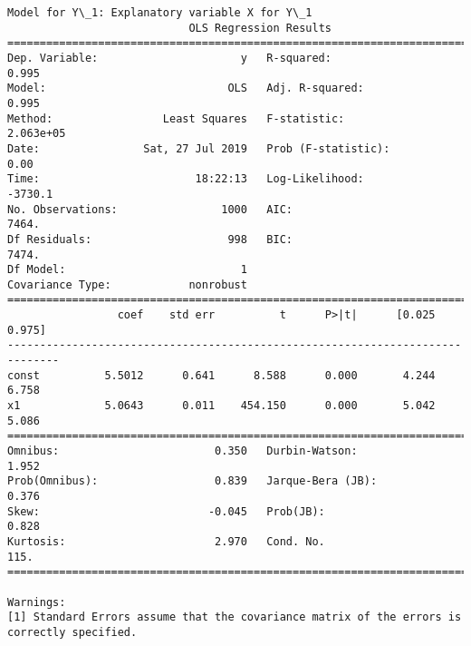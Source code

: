\documentclass[11pt]{article}
\begin{document}
    \begin{Verbatim}[commandchars=\\\{\}]
Model for Y\_1: Explanatory variable X for Y\_1
                            OLS Regression Results                            
==============================================================================
Dep. Variable:                      y   R-squared:                       0.995
Model:                            OLS   Adj. R-squared:                  0.995
Method:                 Least Squares   F-statistic:                 2.063e+05
Date:                Sat, 27 Jul 2019   Prob (F-statistic):               0.00
Time:                        18:22:13   Log-Likelihood:                -3730.1
No. Observations:                1000   AIC:                             7464.
Df Residuals:                     998   BIC:                             7474.
Df Model:                           1                                         
Covariance Type:            nonrobust                                         
==============================================================================
                 coef    std err          t      P>|t|      [0.025      0.975]
------------------------------------------------------------------------------
const          5.5012      0.641      8.588      0.000       4.244       6.758
x1             5.0643      0.011    454.150      0.000       5.042       5.086
==============================================================================
Omnibus:                        0.350   Durbin-Watson:                   1.952
Prob(Omnibus):                  0.839   Jarque-Bera (JB):                0.376
Skew:                          -0.045   Prob(JB):                        0.828
Kurtosis:                       2.970   Cond. No.                         115.
==============================================================================

Warnings:
[1] Standard Errors assume that the covariance matrix of the errors is correctly specified.



\end{Verbatim}
\end{document}
